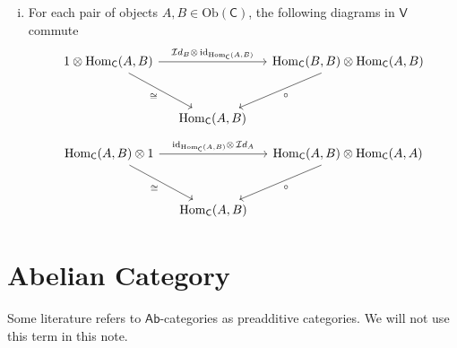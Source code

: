 \documentclass{report}
\begin{document}
{\begin{enumerate}[(i)]
\[\begin{tikzcd}[ampersand replacement=\&, column sep=small]
\end{tikzcd}
    \]
    \item For each pair of objects $A,B\in \mathrm{Ob}(\mathsf{C})$, the following diagrams in $\mathsf{V}$ commute
    \[
    \begin{tikzcd}[ampersand replacement=\&, column sep=small]
        {1\otimes \mathrm{Hom}_{\mathsf{C}}(A,B)} \arrow[rr, "{{\mathcal{I}d}_B\otimes\,\mathrm{id}_{\mathrm{Hom}_{\mathsf{C}}(A,B)}}"] \arrow[rd, "\cong"'] \&                     \& {\mathrm{Hom}_{\mathsf{C}}(B,B)\otimes \mathrm{Hom}_{\mathsf{C}}(A,B)} \arrow[ld, "\circ"] \\[+10pt]
        \& {\mathrm{Hom}_{\mathsf{C}}(A,B)} \&   
\end{tikzcd}
    \]
    \[
        \begin{tikzcd}[ampersand replacement=\&, column sep=small]
            {\mathrm{Hom}_{\mathsf{C}}(A,B)\otimes 1} \arrow[rr, "\mathrm{id}_{\mathrm{Hom}_{\mathsf{C}}(A,B)}\otimes\,{\mathcal{I}d}_A "] \arrow[rd, "\cong"'] \&                     \& {\mathrm{Hom}_{\mathsf{C}}(A,B)\otimes \mathrm{Hom}_{\mathsf{C}}(A,A)} \arrow[ld, "\circ"] \\[+10pt]
            \& {\mathrm{Hom}_{\mathsf{C}}(A,B)} \&
    \end{tikzcd}
        \]
    \end{enumerate}
}


\section{Abelian Category}
Some literature refers to $\mathsf{Ab}$-categories as preadditive categories. We will not use this term in this note.



\end{document}
